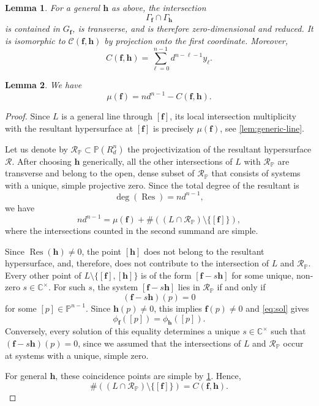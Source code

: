 \documentclass[10pt,a4paper]{amsart}
\newtheorem{lemma}{Lemma}
\newcommand{\CC}{\mathbb{C}}
\newcommand{\PP}{\mathbb{P}}
\DeclareMathOperator{\Res}{Res}
\newcommand{\cR}{\mathcal{R}}
\newcommand{\ff}{\ensuremath{\boldsymbol{f}}}
\newcommand{\hh}{\ensuremath{\boldsymbol{h}}}
\begin{document}
\begin{lemma}
\label{lem:coincidence-pts}
    For a general $\hh$ as above, the intersection \[
    \Gamma_{\ff}\cap \Gamma_{\hh}
    \] is contained in $G_{\ff}$, is transverse, and is therefore zero-dimensional and reduced.
    It is isomorphic to $\mathcal{C}(\ff,\hh)$ by projection onto the first coordinate.
    Moreover, \[
    C(\ff,\hh) = \sum_{\ell=0}^{n-1} d^{n-\ell-1} y_\ell.
    \]
\end{lemma}

\begin{lemma}
\label{lem:count}
We have \[
\mu(\ff) = n d^{n-1} - C(\ff,\hh).
\]
\end{lemma}

\begin{proof}
Since $L$ is a general line through $[\ff]$, its local intersection multiplicity with the resultant hypersurface at $[\ff]$ is precisely $\mu(\ff)$, see \cref{lem:generic-line}.

Let us denote by $\cR_{\PP}\subset\PP(R_d^n)$ the projectivization of the resultant hypersurface $\cR$.
After choosing $\hh$ generically, all the other intersections of $L$ with $\cR_{\PP}$ are transverse and belong to the open, dense subset of $\cR_{\PP}$ that consists of systems with a unique, simple projective zero.
Since the total degree of the resultant is \[
\deg(\Res) = n d^{n-1},
\] 
we have \[
nd^{n-1} = \mu(\ff) + \# \left((L\cap \cR_{\PP})\setminus \{[\ff]\}\right),
\] where the intersections counted in the second summand are simple.

Since $\Res(\hh)\neq 0$, the point $[\hh]$ does not belong to the resultant hypersurface, and, therefore, does not contribute to the intersection of $L$ and $\cR_{\PP}$.
Every other point of $L\setminus\{[\ff],[\hh]\}$ is of the form $[\ff-s\hh]$ for some unique, non-zero $s\in\CC^{\times}$.
For such $s$, the system $[\ff-s\hh]$ lies in $\cR_{\PP}$ if and only if \begin{equation}
    \label{eq:sol}
 (\ff - s \hh)(p)=0
\end{equation} for some $[p]\in\PP^{n-1}$. 
Since $\hh(p)\neq 0$, this implies $\ff(p)\neq 0$ and \cref{eq:sol} gives \[
\phi_{\ff}([p]) = \phi_{\hh}([p]). 
\]
Conversely, every solution of this equality determines a unique $s\in\CC^{\times}$ such that $(\ff-s\hh)(p)=0$, since we assumed that the intersections of $L$ and $\cR_{\PP}$ occur at systems with a unique, simple zero. 

For general $\hh$, these coincidence points are simple by \cref{lem:coincidence-pts}.
Hence,  \[
 \#\left((L\cap \cR_{\PP})\setminus \{[\ff]\}\right) = C(\ff,\hh).
\]
\end{proof}
\end{document}
